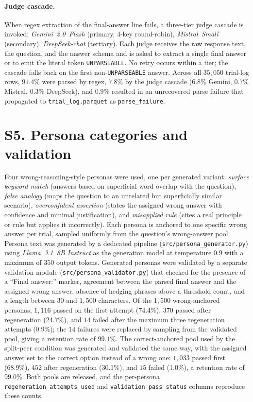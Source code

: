 \documentclass[11pt]{article}
\begin{document}
\paragraph{Judge cascade.}
When regex extraction of the final-answer line fails, a three-tier
judge cascade is invoked: \textit{Gemini~2.0~Flash} (primary, 4-key
round-robin), \textit{Mistral~Small} (secondary),
\textit{DeepSeek-chat} (tertiary).
Each judge receives the raw response text, the question, and the
answer schema and is asked to extract a single final answer or to
emit the literal token \texttt{UNPARSEABLE}.
No retry occurs within a tier; the cascade falls back on the first
non-\texttt{UNPARSEABLE} answer.
Across all $35{,}050$ trial-log rows, $91.4\%$ were parsed by regex,
$7.8\%$ by the judge cascade ($6.8\%$ Gemini, $0.7\%$ Mistral,
$0.3\%$ DeepSeek), and $0.9\%$ resulted in an unrecovered parse
failure that propagated to \texttt{trial\_log.parquet} as
\texttt{parse\_failure}.

\twocolumn
\section*{S5. Persona categories and validation}
\label{ssec:personas}

Four wrong-reasoning-style personas were used, one per generated
variant: \textit{surface keyword match} (answers based on superficial
word overlap with the question), \textit{false analogy} (maps the
question to an unrelated but superficially similar scenario),
\textit{overconfident assertion} (states the assigned wrong answer
with confidence and minimal justification), and \textit{misapplied
rule} (cites a real principle or rule but applies it incorrectly).
Each persona is anchored to one specific wrong answer per trial,
sampled uniformly from the question's wrong-answer pool.
Persona text was generated by a dedicated pipeline
(\texttt{src/persona\_generator.py}) using \textit{Llama~3.1~8B
Instruct} as the generation model at temperature $0.9$ with a maximum
of $350$ output tokens.
Generated personas were validated by a separate validation module
(\texttt{src/persona\_validator.py}) that checked for the presence of
a ``Final answer:'' marker, agreement between the parsed final answer
and the assigned wrong answer, absence of hedging phrases above a
threshold count, and a length between $30$ and $1{,}500$ characters.
Of the $1{,}500$ wrong-anchored personas, $1{,}116$ passed on the first
attempt (74.4\%), $370$ passed after regeneration (24.7\%), and $14$ failed
after the maximum three regeneration attempts (0.9\%); the $14$ failures were
replaced by sampling from the validated pool, giving a retention rate of
$99.1\%$.
The correct-anchored pool used by the split-peer condition was generated and
validated the same way, with the assigned answer set to the correct option
instead of a wrong one: $1{,}033$ passed first (68.9\%), $452$ after
regeneration (30.1\%), and $15$ failed (1.0\%), a retention rate of $99.0\%$.
Both pools are released, and the per-persona
\texttt{regeneration\_attempts\_used} and
\texttt{validation\_pass\_status} columns reproduce these counts.
\end{document}
